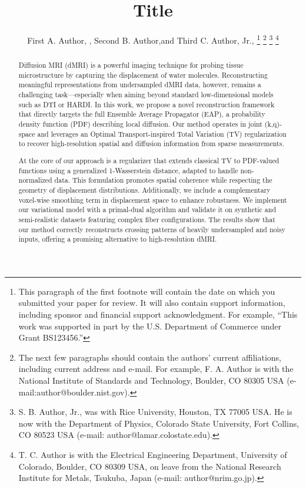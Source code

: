 \documentclass[journal,twoside,web]{ieeecolor}
\begin{document}
\title{Title}
\author{First A. Author, , Second B. Author,and Third C. Author, Jr., 
\thanks{This paragraph of the first footnote will contain the date on which
you submitted your paper for review. It will also contain support information,
including sponsor and financial support acknowledgment. For example, 
``This work was supported in part by the U.S. Department of Commerce under Grant BS123456.'' }
\thanks{The next few paragraphs should contain the authors' current affiliations,
including current address and e-mail. For example, F. A. Author is with the
National Institute of Standards and Technology, Boulder, CO 80305 USA (e-mail:author@boulder.nist.gov). }
\thanks{S. B. Author, Jr., was with Rice University, Houston, TX 77005 USA.
He is now with the Department of Physics, Colorado State University,
Fort Collins, CO 80523 USA (e-mail: author@lamar.colostate.edu).}
\thanks{T. C. Author is with the Electrical Engineering Department,
University of Colorado, Boulder, CO 80309 USA, on leave from the National
Research Institute for Metals, Tsukuba, Japan (e-mail: author@nrim.go.jp).}}

\maketitle

\begin{abstract}
Diffusion MRI (dMRI) is a powerful imaging technique for probing tissue microstructure by capturing the displacement of water molecules. Reconstructing meaningful representations from undersampled dMRI data, however, remains a challenging task—especially when aiming beyond standard low-dimensional models such as DTI or HARDI. In this work, we propose a novel reconstruction framework that directly targets the full Ensemble Average Propagator (EAP), a probability density function (PDF) describing local diffusion. Our method operates in joint
(k,q)-space and leverages an Optimal Transport-inspired Total Variation (TV) regularization to recover high-resolution spatial and diffusion information from sparse measurements.

At the core of our approach is a regularizer that extends classical TV to PDF-valued functions using a generalized 1-Wasserstein distance, adapted to handle non-normalized data. This formulation promotes spatial coherence while respecting the geometry of displacement distributions. Additionally, we include a complementary voxel-wise smoothing term in displacement space to enhance robustness. We implement our variational model with a primal-dual algorithm and validate it on synthetic and semi-realistic datasets featuring complex fiber configurations. The results show that our method correctly reconstructs crossing patterns of heavily undersampled and noisy inputs, offering a promising alternative to high-resolution dMRI.
\end{abstract}
\end{document}

